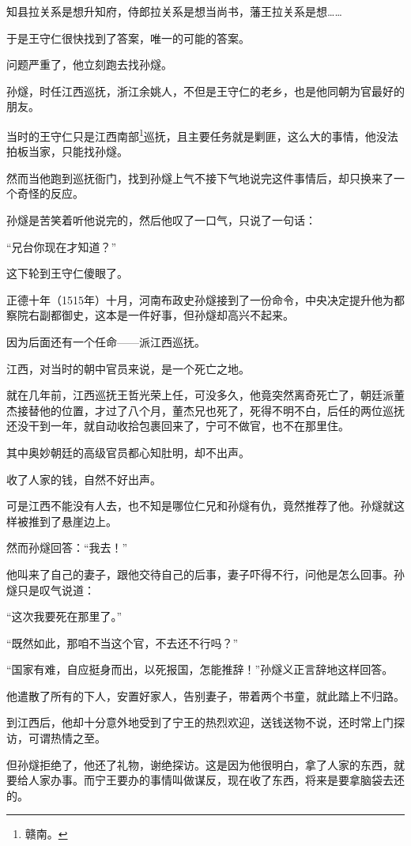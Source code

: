 \begin{multicols}{\theparacolNo}
		知县拉关系是想升知府，侍郎拉关系是想当尚书，藩王拉关系是想……

		于是王守仁很快找到了答案，唯一的可能的答案。

		问题严重了，他立刻跑去找孙燧。

		孙燧，时任江西巡抚，浙江余姚人，不但是王守仁的老乡，也是他同朝为官最好的朋友。

		当时的王守仁只是江西南部\footnote{赣南。}巡抚，且主要任务就是剿匪，这么大的事情，他没法拍板当家，只能找孙燧。

		然而当他跑到巡抚衙门，找到孙燧上气不接下气地说完这件事情后，却只换来了一个奇怪的反应。

		孙燧是苦笑着听他说完的，然后他叹了一口气，只说了一句话：

		“兄台你现在才知道？”

		这下轮到王守仁傻眼了。

		正德十年（1515年）十月，河南布政史孙燧接到了一份命令，中央决定提升他为都察院右副都御史，这本是一件好事，但孙燧却高兴不起来。

		因为后面还有一个任命——派江西巡抚。

		江西，对当时的朝中官员来说，是一个死亡之地。

		就在几年前，江西巡抚王哲光荣上任，可没多久，他竟突然离奇死亡了，朝廷派董杰接替他的位置，才过了八个月，董杰兄也死了，死得不明不白，后任的两位巡抚还没干到一年，就自动收拾包裹回来了，宁可不做官，也不在那里住。

		其中奥妙朝廷的高级官员都心知肚明，却不出声。

		收了人家的钱，自然不好出声。

		可是江西不能没有人去，也不知是哪位仁兄和孙燧有仇，竟然推荐了他。孙燧就这样被推到了悬崖边上。

		然而孙燧回答：“我去！”

		他叫来了自己的妻子，跟他交待自己的后事，妻子吓得不行，问他是怎么回事。孙燧只是叹气说道：

		“这次我要死在那里了。”

		“既然如此，那咱不当这个官，不去还不行吗？”

		“国家有难，自应挺身而出，以死报国，怎能推辞！”孙燧义正言辞地这样回答。

		他遣散了所有的下人，安置好家人，告别妻子，带着两个书童，就此踏上不归路。

		到江西后，他却十分意外地受到了宁王的热烈欢迎，送钱送物不说，还时常上门探访，可谓热情之至。

		但孙燧拒绝了，他还了礼物，谢绝探访。这是因为他很明白，拿了人家的东西，就要给人家办事。而宁王要办的事情叫做谋反，现在收了东西，将来是要拿脑袋去还的。


\end{multicols}
